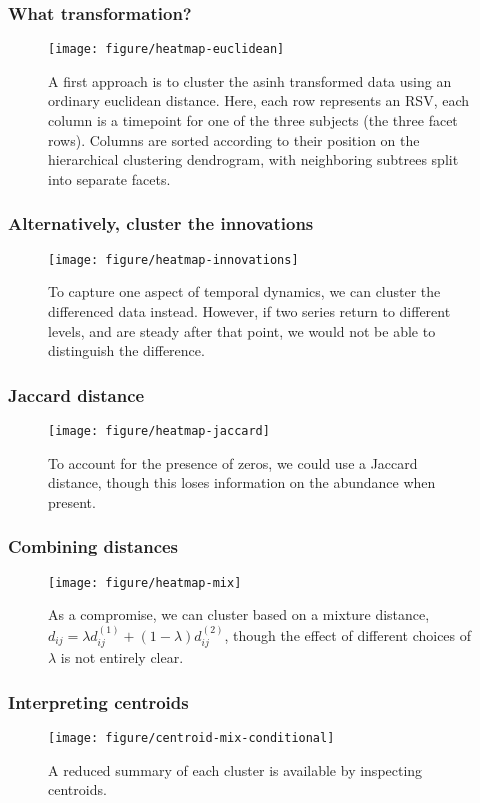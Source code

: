 \documentclass{beamer}
\begin{document}
\begin{frame}
  \frametitle{What transformation?}
 \begin{figure}
   \centering
   \texttt{[image: figure/heatmap-euclidean]}
   \caption{A first approach is to cluster the asinh transformed data using an
     ordinary euclidean distance. Here, each row represents an RSV, each column
     is a timepoint for one of the three subjects (the three facet rows).
     Columns are sorted according to their position on the hierarchical
     clustering dendrogram, with neighboring subtrees split into separate
     facets. \label{fig:heatmap-euclidean}}
 \end{figure}
\end{frame}

\begin{frame}
  \frametitle{Alternatively, cluster the innovations}
 \begin{figure}[ht]
   \centering
   \texttt{[image: figure/heatmap-innovations]}
   \caption{To capture one aspect of temporal dynamics, we can cluster the
     differenced data instead. However, if two series return to different
     levels, and are steady after that point, we would not be able to
     distinguish the difference. \label{fig:heatmap-innovations} }
 \end{figure}
\end{frame}

\begin{frame}
  \frametitle{Jaccard distance}
 \begin{figure}[ht]
   \centering
   \texttt{[image: figure/heatmap-jaccard]}
   \caption{To account for the presence of zeros, we could use a Jaccard
     distance, though this loses information on the abundance when present.
     \label{fig:heatmap-jaccard} }
 \end{figure}
\end{frame}

\begin{frame}
  \frametitle{Combining distances}
 \begin{figure}[ht]
   \centering
   \texttt{[image: figure/heatmap-mix]}
   \caption{As a compromise, we can cluster based on a mixture distance, $d_{ij}
     = \lambda d^{(1)}_{ij} + \left(1 - \lambda\right)d^{(2)}_{ij}$, though the
    effect of different choices of $\lambda$ is not entirely clear.
     \label{fig:heatmap-jaccard} }
 \end{figure}
\end{frame}

\begin{frame}
  \frametitle{Interpreting centroids}
\begin{figure}[ht]
  \centering
  \texttt{[image: figure/centroid-mix-conditional]}
  \caption{A reduced summary of each cluster is available by inspecting
    centroids. \label{fig:centroid-mix-conditional} }
\end{figure}
\end{frame}
\end{document}
